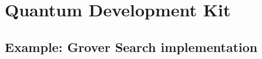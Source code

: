 
\chapter{Quantum Development Kit}
\label{chp:qdk}


\section{Example: Grover Search implementation}
\label{sec:QSgrover}


